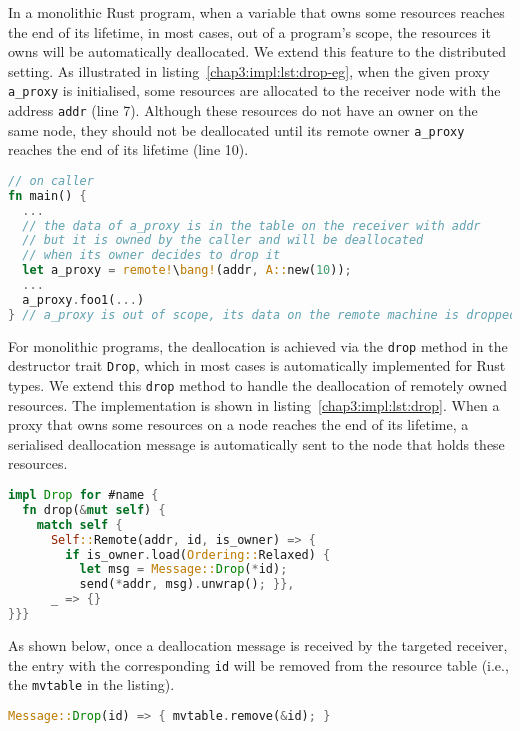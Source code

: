 In a monolithic Rust program, when a variable that owns some resources reaches the end of its lifetime, in most cases, out of a program's scope, the resources it owns will be automatically deallocated. We extend this feature to the distributed setting. As illustrated in listing~\ref{chap3:impl:lst:drop-eg}, when the given proxy \texttt{a\_proxy} is initialised, some resources are allocated to the receiver node with the address \texttt{addr} (line 7). Although these resources do not have an owner on the same node, they should not be deallocated until its remote owner \texttt{a\_proxy} reaches the end of its lifetime (line 10).
\begin{lstlisting}[language=Rust, style=boxed, basicstyle=\footnotesize\ttfamily, caption={An example of a remote deallocation}, label=chap3:impl:lst:drop-eg]
// on caller
fn main() {
  ...
  // the data of a_proxy is in the table on the receiver with addr
  // but it is owned by the caller and will be deallocated
  // when its owner decides to drop it
  let a_proxy = remote!\bang!(addr, A::new(10)); 
  ...
  a_proxy.foo1(...)
} // a_proxy is out of scope, its data on the remote machine is dropped
\end{lstlisting}

For monolithic programs, the deallocation is achieved via the \texttt{drop} method in the destructor trait \texttt{Drop}, which in most cases is automatically implemented for Rust types. We extend this \texttt{drop} method to handle the deallocation of remotely owned resources. The implementation is shown in listing~\ref{chap3:impl:lst:drop}. When a proxy that owns some resources on a node reaches the end of its lifetime, a serialised deallocation message is automatically sent to the node that holds these resources.
\begin{lstlisting}[language=Rust, style=boxed, basicstyle=\footnotesize\ttfamily, caption={The implementation of a remote deallocation}, label=chap3:impl:lst:drop]
impl Drop for #name {
  fn drop(&mut self) {
    match self {
      Self::Remote(addr, id, is_owner) => {
        if is_owner.load(Ordering::Relaxed) {
          let msg = Message::Drop(*id);
          send(*addr, msg).unwrap(); }},
      _ => {}
}}}
\end{lstlisting} 

As shown below, once a deallocation message is received by the targeted receiver, the entry with the corresponding \texttt{id} will be removed from the resource table (i.e., the \texttt{mvtable} in the listing). 
\begin{lstlisting}[language=Rust, style=boxed, basicstyle=\footnotesize\ttfamily]
Message::Drop(id) => { mvtable.remove(&id); }
\end{lstlisting}

